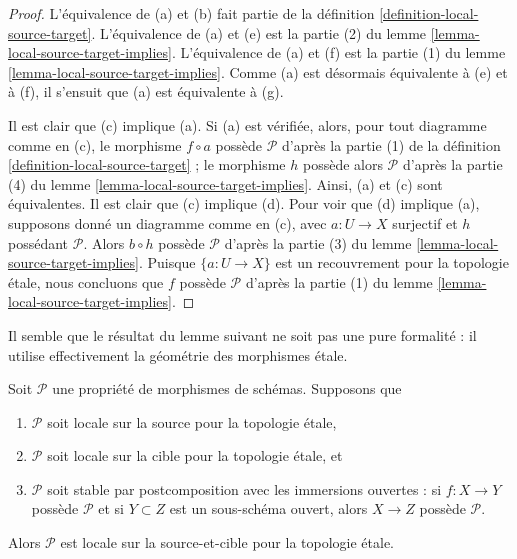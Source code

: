 \begin{proof}
L'équivalence de (a) et (b) fait partie de la
définition \ref{definition-local-source-target}.
L'équivalence de (a) et (e) est la partie (2) du
lemme \ref{lemma-local-source-target-implies}.
L'équivalence de (a) et (f) est la partie (1) du
lemme \ref{lemma-local-source-target-implies}.
Comme (a) est désormais équivalente à (e) et à (f), il s'ensuit que (a) est
équivalente à (g).

\medskip\noindent
Il est clair que (c) implique (a). Si (a) est vérifiée, alors, pour tout
diagramme comme en (c), le morphisme $f \circ a$ possède $\mathcal{P}$ d'après
la partie (1) de la définition \ref{definition-local-source-target} ; le
morphisme $h$ possède alors $\mathcal{P}$ d'après la partie (4) du
lemme \ref{lemma-local-source-target-implies}.
Ainsi, (a) et (c) sont équivalentes. Il est clair que (c) implique (d).
Pour voir que (d) implique (a), supposons donné un diagramme comme en (c),
avec $a : U \to X$ surjectif et $h$ possédant $\mathcal{P}$.
Alors $b \circ h$ possède $\mathcal{P}$ d'après la partie (3) du
lemme \ref{lemma-local-source-target-implies}.
Puisque $\{a : U \to X\}$ est un recouvrement pour la topologie \'etale,
nous concluons que
$f$ possède $\mathcal{P}$ d'après la partie (1) du
lemme \ref{lemma-local-source-target-implies}.
\end{proof}

\noindent
Il semble que le résultat du lemme suivant ne soit pas une pure formalité :
il utilise effectivement la géométrie des morphismes \'etale.

\begin{lemma}
\label{lemma-etale-local-source-target}
Soit $\mathcal{P}$ une propriété de morphismes de schémas. Supposons que
\begin{enumerate}
\item $\mathcal{P}$ soit locale sur la source pour la topologie \'etale,
\item $\mathcal{P}$ soit locale sur la cible pour la topologie \'etale, et
\item $\mathcal{P}$ soit stable par postcomposition avec les immersions
ouvertes : si $f : X \to Y$ possède $\mathcal{P}$ et si $Y \subset Z$ est un
sous-schéma ouvert, alors $X \to Z$ possède $\mathcal{P}$.
\end{enumerate}
Alors $\mathcal{P}$ est locale sur la source-et-cible pour la topologie
\'etale.
\end{lemma}

